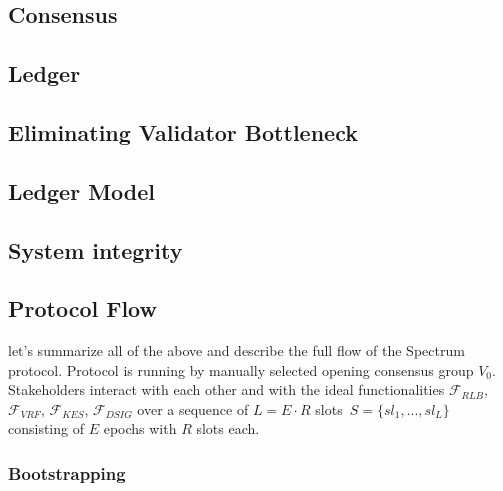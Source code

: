 \subsection{Consensus}\label{subsec:consensus}


\subsection{Ledger}\label{subsec:ledger}


\subsection{Eliminating Validator Bottleneck}\label{subsec:eliminating-validator-bottleneck}


\subsection{Ledger Model}\label{subsec:ledger-model}


\subsection{System integrity}\label{subsec:system-integrity}


\subsection{Protocol Flow}\label{subsec:protocol-flow}
let's summarize all of the above and describe the full flow of the Spectrum protocol.
Protocol is running by manually selected opening consensus group $V_0$.
Stakeholders interact with each other and with the ideal functionalities ${\mathcal{F}}_{RLB}$,\
${\mathcal{F}}_{VRF}$, ${\mathcal{F}}_{KES}$, ${\mathcal{F}}_{DSIG}$ over a sequence of $L = E \cdot R$ slots\
${S=\{sl_1,...,sl_L\}}$ consisting of $E$ epochs with $R$ slots each.

\subsubsection{Bootstrapping}\label{subsubsec:bootstrapping}

